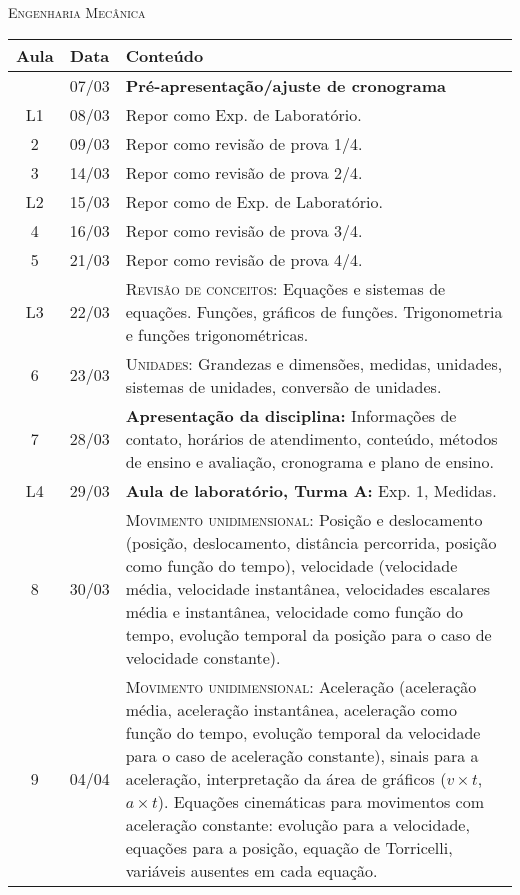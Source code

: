 \vspace{1cm}
\begin{center}
\Large\textsc{Engenharia Mecânica}
\end{center}
\begin{center}
\begin{longtable}{ccp{70mm}}
\toprule
Aula & Data & Conteúdo \\
\midrule
\endhead
\bottomrule
\endfoot
1	 & 	07/03	 & 	\textbf{Pré-apresentação/ajuste de cronograma} \\
L1   &  08/03    &  Repor como Exp. de Laboratório. \\
2	 & 	09/03	 & 	Repor como revisão de prova 1/4.\\
3	 & 	14/03	 & 	Repor como revisão de prova 2/4.  \\
L2   &  15/03    &  Repor como de Exp. de Laboratório. \\
4	 & 	16/03	 & 	Repor como revisão de prova 3/4. \\
5	 & 	21/03	 & 	Repor como revisão de prova 4/4. \\
L3   &  22/03    &  \textsc{Revisão de conceitos:} Equações e sistemas de equações. Funções, gráficos de funções. Trigonometria e funções trigonométricas. \\
6	 & 	23/03	 & 	\textsc{Unidades:} Grandezas e dimensões, medidas, unidades, sistemas de unidades, conversão de unidades. \\
7	 & 	28/03	 & 	\textbf{Apresentação da disciplina:} Informações de contato, horários de atendimento, conteúdo, métodos de ensino e avaliação, cronograma e plano de ensino.\\
L4   &  29/03    &  \textbf{Aula de laboratório, Turma A:} Exp. 1, Medidas. \\
8	 & 	30/03	 & 	\textsc{Movimento unidimensional:} Posição e deslocamento (posição, deslocamento, distância percorrida, posição como função do tempo), velocidade (velocidade média, velocidade instantânea, velocidades escalares média e instantânea, velocidade como função do tempo, evolução temporal da posição para o caso de velocidade constante).\\
9	 & 	04/04	 & 	\textsc{Movimento unidimensional:} Aceleração (aceleração média, aceleração instantânea, aceleração como função do tempo, evolução temporal da velocidade para o caso de aceleração constante), sinais para a aceleração, interpretação da área de gráficos ($v \times t$, $a \times  t$). Equações cinemáticas para movimentos com aceleração constante: evolução para a velocidade, equações para a posição, equação de Torricelli, variáveis ausentes em cada equação.\\

\end{longtable}
\end{center}
